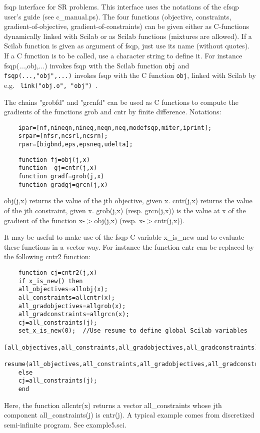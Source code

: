 \begin{mandescription}
  
  fsqp interface for SR problems. This interface uses the notations of the cfsqp
  user's guide (see c\_manual.ps).
  The four functions (objective, constraints, gradient-of-objective,
  gradient-of-constraints) can be given either as C-functions dynamically
  linked with Scilab or as Scilab functions (mixtures are allowed).
  If a Scilab function is given as argument of fsqp, 
  just use its name (without quotes). If a C function is to be called,
  use a character string to define it. For instance fsqp(...,obj,...)
  invokes fsqp with the Scilab function \verb!obj! and
  \verb!fsqp(...,"obj",...)! invokes fsqp with the C function 
  \verb!obj!, linked with Scilab by e.g. \verb! link("obj.o", "obj") !.
  
  The chains "grobfd" and "grcnfd" can be used as C functions to compute
  the gradients of the functions grob and cntr by finite difference.
  Notations:
  
  \begin{Verbatim}
    ipar=[nf,nineqn,nineq,neqn,neq,modefsqp,miter,iprint];
    srpar=[nfsr,ncsrl,ncsrn];
    rpar=[bigbnd,eps,epsneq,udelta];
  \end{Verbatim}

  \begin{Verbatim}
    function fj=obj(j,x)
    function  gj=cntr(j,x)
    function gradf=grob(j,x)
    function gradgj=grcn(j,x)
  \end{Verbatim}

  obj(j,x) returns the value of the jth objective, given x.
  cntr(j,x) returns the value of the jth constraint, given x.
  grob(j,x) (resp. grcn(j,x)) is the value at x of the gradient of the 
  function x-$>$obj(j,x) (resp.  x-$>$cntr(j,x)).
  
  It may be useful to make use of the fsqp C variable x\_is\_new and to
  evaluate these functions in a vector way. For instance the function
  cntr can be replaced by the following cntr2 function:
  
  \begin{Verbatim}
    function cj=cntr2(j,x)
    if x_is_new() then
    all_objectives=allobj(x);
    all_constraints=allcntr(x);
    all_gradobjectives=allgrob(x);
    all_gradconstraints=allgrcn(x);
    cj=all_constraints(j);
    set_x_is_new(0);  //Use resume to define global Scilab variables
    [all_objectives,all_constraints,all_gradobjectives,all_gradconstraints]=....
    resume(all_objectives,all_constraints,all_gradobjectives,all_gradconstraints);
    else
    cj=all_constraints(j);
    end
  \end{Verbatim}

  Here, the function allcntr(x) returns a vector all\_constraints whose
  jth component all\_constraints(j) is cntr(j).
  A typical example comes from discretized semi-infinite program. 
  See example5.sci.
  
\end{mandescription}

